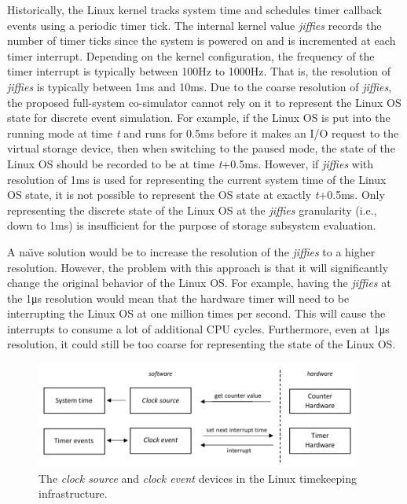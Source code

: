 Historically, the Linux kernel tracks system time and schedules timer callback events using a periodic timer tick. The internal kernel value \textit{jiffies} records the number of timer ticks since the system is powered on and is incremented at each timer interrupt. Depending on the kernel configuration, the frequency of the timer interrupt is typically between 100Hz to 1000Hz. That is, the resolution of \textit{jiffies} is typically between 1\si{\milli\second} and 10\si{\milli\second}. Due to the coarse resolution of \textit{jiffies}, the proposed full-system co-simulator cannot rely on it to represent the Linux OS state for discrete event simulation. For example, if the Linux OS is put into the running mode at time \textit{t} and runs for 0.5\si{\milli\second} before it makes an I/O request to the virtual storage device, then when switching to the paused mode, the state of the Linux OS should be recorded to be at time \textit{t}+0.5\si{\milli\second}. However, if \textit{jiffies} with resolution of 1\si{\milli\second} is used for representing the current system time of the Linux OS state, it is not possible to represent the OS state at exactly \textit{t}+0.5\si{\milli\second}. Only representing the discrete state of the Linux OS at the \textit{jiffies} granularity (i.e., down to 1\si{\milli\second}) is insufficient for the purpose of storage subsystem evaluation.

A na\"{\i}ve solution would be to increase the resolution of the \textit{jiffies} to a higher resolution. However, the problem with this approach is that it will significantly change the original behavior of the Linux OS. For example, having the \textit{jiffies} at the 1\si{\micro\second} resolution would mean that the hardware timer will need to be interrupting the Linux OS at one million times per second. This will cause the interrupts to consume a lot of additional CPU cycles. Furthermore, even at 1\si{\micro\second} resolution, it could still be too coarse for representing the state of the Linux OS.

\begin{figure}[htpb]
	\centering
	\includegraphics[width=0.95\textwidth]{figures/ch5-clocksource-clockevent.pdf}
	\caption[The \textit{clock source} and \textit{clock event} devices.]{\label{fig:ch5-clocksource-clockevent}The \textit{clock source} and \textit{clock event} devices in the Linux timekeeping infrastructure.}
\end{figure}

